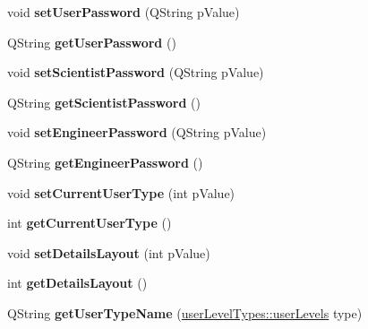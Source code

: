 \begin{DoxyCompactItemize}
\item 
\hypertarget{classQELogin_a1910c8e940b45f5966b8bb1e43c14e75}{
void {\bfseries setUserPassword} (QString pValue)}
\label{classQELogin_a1910c8e940b45f5966b8bb1e43c14e75}

\item 
\hypertarget{classQELogin_a9590da0d1f298f1d7e1ae63aabce5689}{
QString {\bfseries getUserPassword} ()}
\label{classQELogin_a9590da0d1f298f1d7e1ae63aabce5689}

\item 
\hypertarget{classQELogin_a33e0e11e9e34248b39dc9c23a797f429}{
void {\bfseries setScientistPassword} (QString pValue)}
\label{classQELogin_a33e0e11e9e34248b39dc9c23a797f429}

\item 
\hypertarget{classQELogin_a7152963ebb09297f550f0a129cb77101}{
QString {\bfseries getScientistPassword} ()}
\label{classQELogin_a7152963ebb09297f550f0a129cb77101}

\item 
\hypertarget{classQELogin_afc734b2a8c5432946f3c6b1c7a245374}{
void {\bfseries setEngineerPassword} (QString pValue)}
\label{classQELogin_afc734b2a8c5432946f3c6b1c7a245374}

\item 
\hypertarget{classQELogin_afb3a491ee4a238e0896d8e6ad7afc875}{
QString {\bfseries getEngineerPassword} ()}
\label{classQELogin_afb3a491ee4a238e0896d8e6ad7afc875}

\item 
\hypertarget{classQELogin_a1cd337ccee3961e88412db959678f25b}{
void {\bfseries setCurrentUserType} (int pValue)}
\label{classQELogin_a1cd337ccee3961e88412db959678f25b}

\item 
\hypertarget{classQELogin_a628a4606503ae46dbf551b71dd26bd96}{
int {\bfseries getCurrentUserType} ()}
\label{classQELogin_a628a4606503ae46dbf551b71dd26bd96}

\item 
\hypertarget{classQELogin_af8aab36c993af312a43e5e2540d4ce2a}{
void {\bfseries setDetailsLayout} (int pValue)}
\label{classQELogin_af8aab36c993af312a43e5e2540d4ce2a}

\item 
\hypertarget{classQELogin_ae95902a9ce8e3c24f9404862e6ae63c3}{
int {\bfseries getDetailsLayout} ()}
\label{classQELogin_ae95902a9ce8e3c24f9404862e6ae63c3}

\item 
\hypertarget{classQELogin_ab36cce30019e22008cf1cd73a0aeb6dd}{
QString {\bfseries getUserTypeName} (\hyperlink{classuserLevelTypes_a033cf2a40f620286b1839dd360c8497b}{userLevelTypes::userLevels} type)}
\label{classQELogin_ab36cce30019e22008cf1cd73a0aeb6dd}


\end{DoxyCompactItemize}
